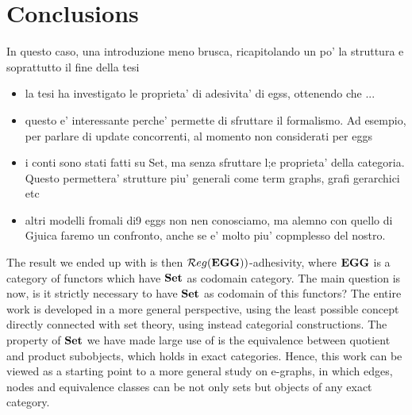 \chapter*{Conclusions}

In questo caso, una introduzione meno brusca, ricapitolando un po' la struttura e soprattutto il fine della tesi

\begin{itemize}
\item la tesi ha investigato le proprieta' di adesivita' di egss, ottenendo che ...
\item questo e' interessante perche' permette di sfruttare il formalismo. Ad esempio, per parlare di update concorrenti, al momento non considerati per eggs
\item i conti sono stati fatti su Set, ma senza sfruttare l;e proprieta' della categoria. Questo permettera' strutture piu' generali come term graphs, grafi gerarchici etc
\item altri modelli fromali di9 eggs non nen conosciamo, ma alemno con quello di Gjuica faremo un confronto, anche se e' molto piu' copmplesso del nostro.
\end{itemize}

The result we ended up with is then $\mathcal{R}eg(\mathbf{EGG}))$-adhesivity, where $\mathbf{EGG}$ is a category of functors which have $\mathbf{Set}$ as codomain category.
The main question is now, is it strictly necessary to have $\mathbf{Set}$ as codomain of this functors? The entire work is developed in a more general perspective, using the least possible concept directly connected with set theory, using instead categorial constructions. The property of $\mathbf{Set}$ we have made large use of is the equivalence between quotient and product subobjects, which holds in exact categories.
Hence, this work can be viewed as a starting point to a more general study on e-graphs, in which edges, nodes and equivalence classes can be not only sets but objects of any exact category.


